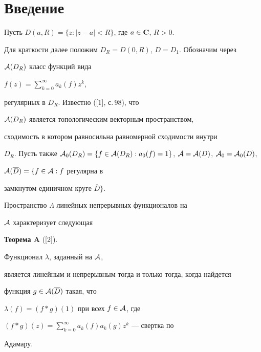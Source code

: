 \maketitle


\label{begin}





\section{Введение}





Пусть $D(a,R)= \{z:|z-a|<R \}$, где $a \in \bold C$, $R>0$.


Для краткости далее положим $D_R =D(0,R)$, $D=D_1$. Обозначим  через


${\cal A}(D_R)$ класс  функций вида


$f(z)=\sum\limits_{k=0}^{\infty} a_k (f) z^k$,


регулярных в $D_R$. Известно ([1], с.\,98), что


${\cal A}(D_R)$ является топологическим векторным пространством,


сходимость в котором равносильна равномерной сходимости внутри


$D_R$. Пусть также ${\cal A}_0 (D_R) = \{ f \in {\cal A} (D_R):


a_0 (f)=1 \}$, ${\cal A} = {\cal A}(D)$, ${\cal A}_0 ={\cal A}_0 (D)$,


${\cal A}(\overline{D})= \{ f \in {\cal A}: f$ регулярна в


замкнутом единичном круге $\overline{D} \}$.





Пространство $\Lambda$ линейных непрерывных функционалов на


${\cal A}$ характеризует следующая


\medskip





{\bf Теорема A} ([2]). {\it


Функционал $\lambda$, заданный на ${\cal A}$,


является линейным и непрерывным тогда и только тогда, когда найдется


функция $g \in {\cal A}( \overline{D})$ такая, что


$\lambda(f)=(f*g)(1)$ при всех $f \in {\cal A}$, где


$(f*g)(z)= \sum\limits_{k=0}^{\infty} a_k (f) a_k (g) z^k$ --- свертка по


Адамару.


}



